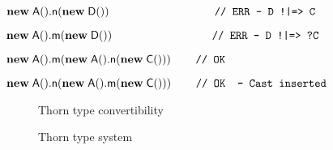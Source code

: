 \documentclass[acmlarge, anonymous, authordraft, review]{acmart} %
\begin{document}
\medskip
\( \Call {\New \A{}}\n {\New \D{} } \ \ \ \ \ \ \ \ \ \ \ \ \ \ \ \ \ \ \ \ \ \ \ \ \ \ \ \ \texttt{// ERR -- D !|=> C} \)

\( \Call {\New \A{}}\m {\New \D{}} \ \ \ \ \ \ \ \ \ \ \ \ \ \ \ \ \ \ \ \ \ \ \ \ \ \texttt{ // ERR -- D !|=> ?C }\)

\( \Call {\New \A{}} \m { \Call {\New \A {}} \n {\New \C{}} } \ \ \ \ \ \texttt{ // OK }\)

\( \Call {\New \A{}} \n { \Call {\New \A{}} \m {\New \C{}}} \ \ \ \ \ \texttt{ // OK \   -- Cast inserted} \)

\medskip


\begin{figure}[!b] \hrulefill  \small
  \vspace{-3mm}
  
\begin{mathpar}




\end{mathpar}
\hrulefill
\caption{Thorn type convertibility}\label{f:thornts}


\hrulefill  
\vspace{0.5mm}

\begin{mathpar}  
\end{mathpar}

\hrulefill
\caption{Thorn type system}\label{f:thornts}
 

\hrulefill

\medskip


\end{figure}
\end{document}
